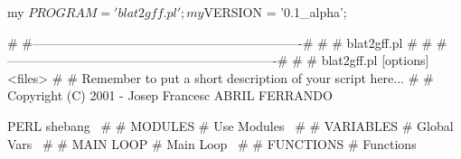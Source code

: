 \documentclass[11pt]{article}
\def\nwendcode{\endtrivlist \endgroup} %
\let\nwdocspar=\par                    %
\begin{document}



\begin{itemize}
 
\end{itemize}

\newpage %


\nwenddocs{}\endmoddef
my $PROGRAM = 'blat2gff.pl';
my $VERSION = '0.1_alpha';
\nwendcode{}\nwdocspar

\nwenddocs{}\endmoddef
# #----------------------------------------------------------------#
# #                          blat2gff.pl                           #
# #----------------------------------------------------------------#
# 
#    blat2gff.pl [options] <files>
#
#    Remember to put a short description of your script here...
# 
#     Copyright (C) 2001 - Josep Francesc ABRIL FERRANDO  
\nwendcode{}\nwdocspar


\nwenddocs{}\endmoddef
\LA{}PERL shebang~{\nwtagstyle{}}\RA{}
#
# MODULES
#
\LA{}Use Modules~{\nwtagstyle{}}\RA{}
#
# VARIABLES
#
\LA{}Global Vars~{\nwtagstyle{}}\RA{}
#
# MAIN LOOP
#
\LA{}Main Loop~{\nwtagstyle{}}\RA{}
#
# FUNCTIONS
#
\LA{}Functions~{\nwtagstyle{}}\RA{}
\nwendcode{}\nwdocspar

\nwenddocs{}\endmoddef
{}\nwendcode{}\nwdocspar
\end{document}
